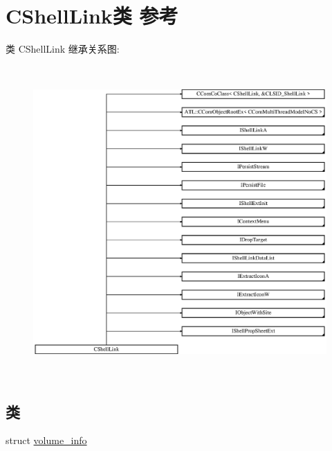 \hypertarget{class_c_shell_link}{}\section{C\+Shell\+Link类 参考}
\label{class_c_shell_link}
类 C\+Shell\+Link 继承关系图\+:\begin{figure}[H]
\begin{center}
\leavevmode
\includegraphics[height=11.931818cm]{class_c_shell_link}
\end{center}
\end{figure}
\subsection*{类}
\begin{DoxyCompactItemize}
\item 
struct \hyperlink{struct_c_shell_link_1_1volume__info}{volume\+\_\+info}
\end{DoxyCompactItemize}
